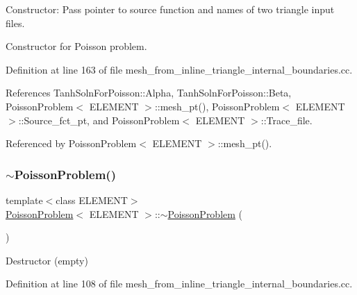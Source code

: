 Constructor\+: Pass pointer to source function and names of two triangle input files. 

Constructor for Poisson problem. 

Definition at line 163 of file mesh\+\_\+from\+\_\+inline\+\_\+triangle\+\_\+internal\+\_\+boundaries.\+cc.



References Tanh\+Soln\+For\+Poisson\+::\+Alpha, Tanh\+Soln\+For\+Poisson\+::\+Beta, Poisson\+Problem$<$ E\+L\+E\+M\+E\+N\+T $>$\+::mesh\+\_\+pt(), Poisson\+Problem$<$ E\+L\+E\+M\+E\+N\+T $>$\+::\+Source\+\_\+fct\+\_\+pt, and Poisson\+Problem$<$ E\+L\+E\+M\+E\+N\+T $>$\+::\+Trace\+\_\+file.



Referenced by Poisson\+Problem$<$ E\+L\+E\+M\+E\+N\+T $>$\+::mesh\+\_\+pt().

\mbox{\label{classPoissonProblem_ac247e42d2d292200617f4b9db7ed1ab8}} 
\subsubsection{\texorpdfstring{$\sim$\+Poisson\+Problem()}{~PoissonProblem()}\hspace{0.1cm}{\footnotesize\ttfamily [1/2]}}
{\footnotesize\ttfamily template$<$class E\+L\+E\+M\+E\+NT$>$ \\
\hyperlink{classPoissonProblem}{Poisson\+Problem}$<$ E\+L\+E\+M\+E\+NT $>$\+::$\sim$\hyperlink{classPoissonProblem}{Poisson\+Problem} (\begin{DoxyParamCaption}{ }\end{DoxyParamCaption})\hspace{0.3cm}{\ttfamily [inline]}}



Destructor (empty) 



Definition at line 108 of file mesh\+\_\+from\+\_\+inline\+\_\+triangle\+\_\+internal\+\_\+boundaries.\+cc.

\mbox{\label{classPoissonProblem_a9c28346c473d246d8f61022365e742ea}} 
